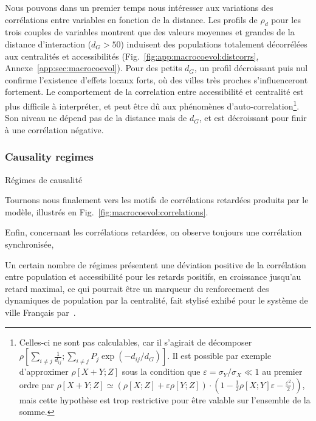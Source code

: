 Nous pouvons dans un premier temps nous intéresser aux variations des corrélations entre variables en fonction de la distance. Les profils de $\rho_d$ pour les trois couples de variables montrent que des valeurs moyennes et grandes de la distance d'interaction ($d_G > 50$) induisent des populations totalement décorrélées aux centralités et accessibilités (Fig.~\ref{fig:app:macrocoevol:distcorrs}, Annexe~\ref{app:sec:macrocoevol}). Pour des petits $d_G$, un profil décroissant puis nul confirme l'existence d'effets locaux forts, où des villes très proches s'influenceront fortement. Le comportement de la correlation entre accessibilité et centralité est plus difficile à interpréter, et peut être dû aux phénomènes d'auto-correlation\footnote{Celles-ci ne sont pas calculables, car il s'agirait de décomposer $\rho\left[\sum_{i\neq j} \frac{1}{d_{ij}}; \sum_{i\neq j} P_j \exp{\left(-d_{ij}/d_G\right)}\right]$. Il est possible par exemple d'approximer $\rho\left[X+Y;Z\right]$ sous la condition que $\varepsilon = \sigma_Y / \sigma_X \ll 1$ au premier ordre par $\rho\left[ X+Y;Z \right] \simeq \left(\rho\left[ X;Z \right]  + \varepsilon \rho\left[Y;Z\right]\right)\cdot\left(1 - \frac{1}{2}\rho\left[X;Y\right]\varepsilon - \frac{\varepsilon^2}{2})\right)$, mais cette hypothèse est trop restrictive pour être valable sur l'ensemble de la somme.}. Son niveau ne dépend pas de la distance mais de $d_G$, et est décroissant pour finir à une corrélation négative.




\subsubsection{Causality regimes}{Régimes de causalité}


Tournons nous finalement vers les motifs de corrélations retardées produits par le modèle, illustrés en Fig.~\ref{fig:macrocoevol:correlations}.


Enfin, concernant les corrélations retardées, on observe toujours une corrélation synchronisée, 


Un certain nombre de régimes présentent une déviation positive de la corrélation entre population et accessibilité pour les retards positifs, en croissance jusqu'au retard maximal, ce qui pourrait être un marqueur du renforcement des dynamiques de population par la centralité, fait stylisé exhibé pour le système de ville Français par~\cite{bretagnolle:tel-00459720}.

